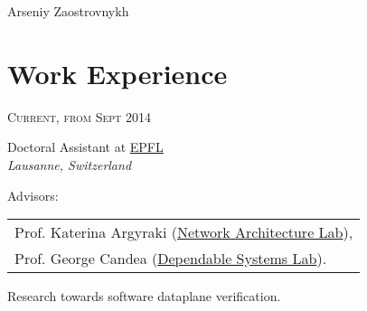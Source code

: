 \documentclass[10pt]{article} %
\begin{document}
\color{text1} %


\begin{flushright}
{\sffamily\Huge Arseniy Zaostrovnykh}\\ %
\end{flushright}
\vspace{-14pt}


\begin{minipage}[h]{0.5\textwidth} %
\vspace{0pt} %
	

\section{Work Experience} 


{\raggedleft\textsc{Current, from Sept 2014}\par}

{\raggedright\large Doctoral Assistant at \textsc{\href{http://phd.epfl.ch/edic}{EPFL}}\\
\textit{Lausanne, Switzerland}\\[4pt]}

\begin{normalsize}
Advisors: 
\begin{tabular}{l}
    Prof. Katerina Argyraki (\href{http://nal.epfl.ch}{Network Architecture Lab}),\\
    Prof. George Candea (\href{http://dslab.epfl.ch}{Dependable Systems Lab}).
\end{tabular}
Research towards software dataplane verification.\\
\end{normalsize}


\end{minipage}
\end{document}
